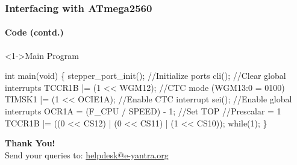 \documentclass[table,10pt,red]{beamer}	%
\begin{document}
\begin{frame}[shrink = 2,fragile]
	\frametitle{Interfacing with ATmega2560}
	\framesubtitle{Code (contd.)}
	\begin{block}<1->{Main Program}
		\begin{semiverbatim}
			\scriptsize{
int main(void)
\{
    stepper\_port\_init(); \color{comment}//Initialize ports\color{black}
\pause
    cli(); \color{comment}//Clear global interrupts\color{black}
    TCCR1B |= (1 << WGM12); \color{comment}//CTC mode (WGM13:0 = 0100)\color{black}
    TIMSK1 |= (1 << OCIE1A); \color{comment}//Enable CTC interrupt\color{black}
    sei(); \color{comment}//Enable global interrupts\color{black}
\pause
    OCR1A = (F\_CPU / SPEED) - 1; \color{comment}//Set TOP\color{black}
\pause
    \color{comment}//Prescalar = 1\color{black}
    TCCR1B |= ((0 << CS12) | (0 << CS11) | (1 << CS10));
\pause
    while(1);
\}
			}
		\end{semiverbatim}
	\end{block}
\end{frame}


\begin{frame}
	\begin{center}
		\textbf{\LARGE Thank You!} \\
		\vspace{20pt}
		\scriptsize Send your queries to: 
		\href{mailto:helpdesk@e-yantra.org} {\color{blue}helpdesk@e-yantra.org \color{black}}
	\end{center}
\end{frame}
\end{document}
